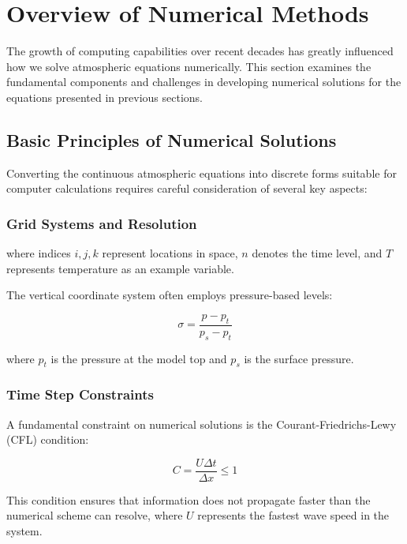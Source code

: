 \section{Overview of Numerical Methods}

The growth of computing capabilities over recent decades has greatly influenced how we solve atmospheric equations numerically. This section examines the fundamental components and challenges in developing numerical solutions for the equations presented in previous sections.

\subsection{Basic Principles of Numerical Solutions}

Converting the continuous atmospheric equations into discrete forms suitable for computer calculations requires careful consideration of several key aspects:



\subsubsection{Grid Systems and Resolution}



where indices $i,j,k$ represent locations in space, $n$ denotes the time level, and $T$ represents temperature as an example variable.

The vertical coordinate system often employs pressure-based levels:

\begin{equation}
\sigma = \frac{p - p_t}{p_s - p_t}
\label{eq:60}
\end{equation}

where $p_t$ is the pressure at the model top and $p_s$ is the surface pressure.

\subsubsection{Time Step Constraints}

A fundamental constraint on numerical solutions is the Courant-Friedrichs-Lewy (CFL) condition:

\begin{equation}
C = \frac{U\Delta t}{\Delta x} \leq 1
\label{eq:61}
\end{equation}

This condition ensures that information does not propagate faster than the numerical scheme can resolve, where $U$ represents the fastest wave speed in the system.